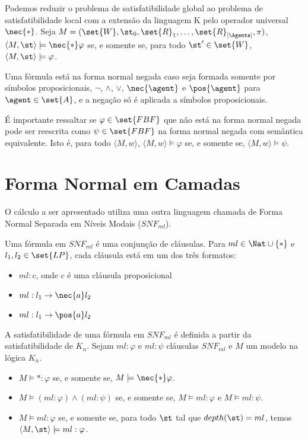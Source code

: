 Podemos reduzir o problema de satisfatibilidade global ao problema de satisfatibilidade local com a extensão da linguagem K pelo operador universal $\nec{*}$. Seja $M = (\set{W}, \st_0, \set{R}_1, \ldots, \set{R}_{|\Agents|}, \pi)$, $\langle M,\st \rangle \models \nec{*}\varphi$ se, e somente se, para todo $\st' \in \set{W}$, $\langle M,\st \rangle \models \varphi$.

\begin{definition}
	Uma fórmula está na forma normal negada caso seja formada somente por símbolos proposicionais, $\neg$, $\land$, $\lor$, $\nec{\agent}$ e $\pos{\agent}$ para $\agent \in \set{A}$, e a negação só é aplicada a símbolos proposicionais.
\end{definition}

É importante ressaltar se $\varphi \in \set{FBF}$ que não está na forma normal negada pode ser reescrita como $\psi \in \set{FBF}$ na forma normal negada com semântica equivalente. Isto é, para todo $\langle M, w \rangle$, $\langle M, w \rangle \models \varphi$ se, e somente se, $\langle M, w \rangle \models \psi$.

\section{Forma Normal em Camadas}
O cálculo a ser apresentado utiliza uma outra linguagem chamada de Forma Normal Separada em Níveis Modais ($SNF_{ml}$).

\begin{definition}
	Uma fórmula em $SNF_{ml}$ é uma conjunção de cláusulas. Para $ml \in \Nat \cup \{*\}$ e $l_1, l_2 \in \set{LP}$, cada cláusula está em um dos três formatos:
	\begin{itemize}
		\item $ml: c$, onde $c$ é uma cláusula proposicional
		\item $ml: l_1 \rightarrow \nec{a}l_2$
		\item $ml: l_1 \rightarrow \pos{a}l_2$
	\end{itemize}
\end{definition}

A satisfatibilidade de uma fórmula em $SNF_{ml}$ é definida a partir da satisfatibilidade de $K_n$. Sejam $ml: \varphi$ e $ml: \psi$ cláusulas $SNF_{ml}$ e $M$ um modelo na lógica $K_n$.

\begin{itemize}
	\item $M \models *: \varphi$ se, e somente se, $M \models \nec{*}\varphi$.
	\item $M \models (ml: \varphi) \land (ml: \psi)$ se, e somente se, $M \models ml: \varphi$ e $M \models ml: \psi$.
	\item $M \models ml: \varphi$ se, e somente se, para todo $\st$ tal que $depth(\st) = ml$, temos $\langle M, \st \rangle \models ml: \varphi$.
\end{itemize}

